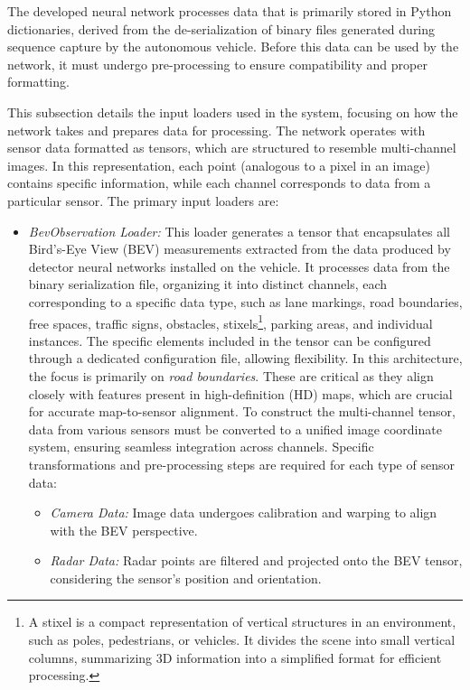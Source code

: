 The developed neural network processes data that is primarily stored in Python dictionaries, derived from the de-serialization of binary files generated during sequence capture by the autonomous vehicle. Before this data can be used by the network, it must undergo pre-processing to ensure compatibility and proper formatting.

This subsection details the input loaders used in the system, focusing on how the network takes and prepares data for processing. The network operates with sensor data formatted as tensors, which are structured to resemble multi-channel images. In this representation, each point (analogous to a pixel in an image) contains specific information, while each channel corresponds to data from a particular sensor. 
The primary input loaders are:
\begin{itemize}
    \item \textit{BevObservation Loader:} This loader generates a tensor that encapsulates all Bird's-Eye View (BEV) measurements extracted from the data produced by detector neural networks installed on the vehicle. It processes data from the binary serialization file, organizing it into distinct channels, each corresponding to a specific data type, such as lane markings, road boundaries, free spaces, traffic signs, obstacles, stixels\footnote{A stixel is a compact representation of vertical structures in an environment, such as poles, pedestrians, or vehicles. It divides the scene into small vertical columns, summarizing 3D information into a simplified format for efficient processing.}, parking areas, and individual instances. The specific elements included in the tensor can be configured through a dedicated configuration file, allowing flexibility.
    In this architecture, the focus is primarily on \textit{road boundaries}. These are critical as they align closely with features present in high-definition (HD) maps, which are crucial for accurate map-to-sensor alignment.
    To construct the multi-channel tensor, data from various sensors must be converted to a unified image coordinate system, ensuring seamless integration across channels. Specific transformations and pre-processing steps are required for each type of sensor data:
    \begin{itemize}
        \item \textit{Camera Data:} Image data undergoes calibration and warping to align with the BEV perspective.
        \item \textit{Radar Data:} Radar points are filtered and projected onto the BEV tensor, considering the sensor's position and orientation.

\end{itemize}
\end{itemize}
